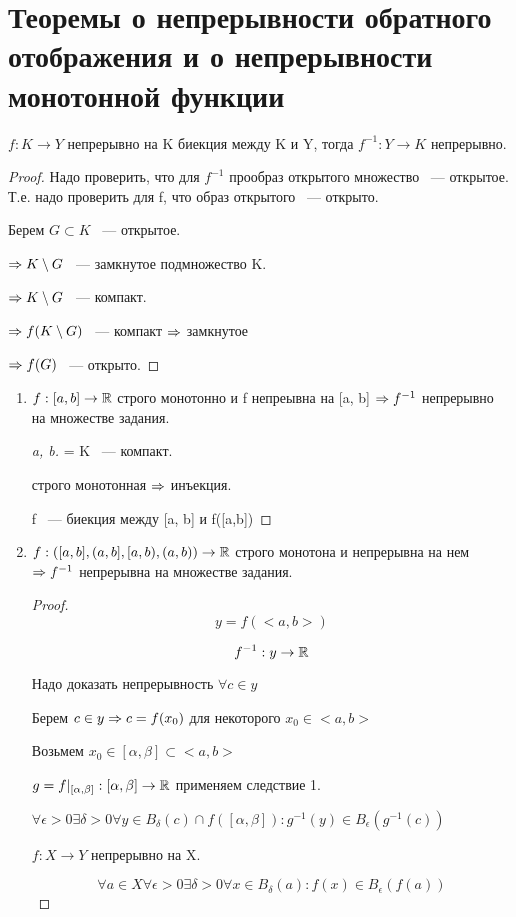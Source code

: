﻿\section{Теоремы о непрерывности обратного отображения и о непрерывности монотонной функции}

\begin{theorem}{}
$f: K \to Y$ непрерывно на K биекция между K и Y, тогда $f^{-1}: Y \to K$ непрерывно.
\end{theorem}

\begin{proof}

Надо проверить, что для $f^{-1}$ прообраз открытого множество ~--- открытое. Т.е. надо проверить для f, что образ открытого ~--- открыто.

Берем $G \subset K$ ~--- открытое.

$\Rightarrow K \mathbin{\backslash} G$ ~--- замкнутое подмножество  K.
 
$\Rightarrow K\mathbin{\backslash} G$ ~--- компакт.

$\Rightarrow f(K \mathbin{\backslash} G)$ ~--- компакт $\Rightarrow$ замкнутое

$\Rightarrow f(G)$ ~--- открыто. 
\end{proof}


\begin{conseq}{}
 \begin{enumerate}
 \item $f:[a, b] \to \mathbb{R}$ строго монотонно и f непреывна на [a, b] $\Rightarrow f^{-1}$ непрерывно на множестве задания.
  \begin{proof}
   [a, b] = K ~--- компакт.

   строго монотонная $\Rightarrow$ инъекция.

   f ~--- биекция между [a, b] и f([a,b])
  \end{proof}
 \item $f:([a,b], (a, b], [a, b), (a,b)) \to \mathbb{R}$ строго монотона и непрерывна на нем $\Rightarrow f^{-1}$ непрерывна на множестве задания.
   \begin{proof}
   $$ y = f(<a,b>) $$

   $$f^{-1}:y \to \mathbb{R}$$

   Надо доказать непрерывность $\forall c \in y$

   Берем $c \in y \Rightarrow c = f(x_0)$ для некоторого $x_0 \in <a, b>$

   Возьмем $x_0 \in [\alpha, \beta] \subset <a, b>$

   $g = f|_{[\alpha, \beta]}: [\alpha, \beta] \to \mathbb{R} $ применяем следствие 1.

   $\forall \epsilon > 0 \exists \delta > 0 \forall y \in B_{\delta}(c) \cap f([\alpha, \beta]): g^{-1}(y) \in B_{\epsilon}(g^{-1}(c))$

   $f: X \to Y$ непрерывно на X.
    
   $$\forall a \in X \forall \epsilon > 0 \exists \delta > 0 \forall x \in B_{\delta}(a): f(x) \in B_{\epsilon}(f(a)) $$

   \end{proof}
 \end{enumerate}
\end{conseq}


